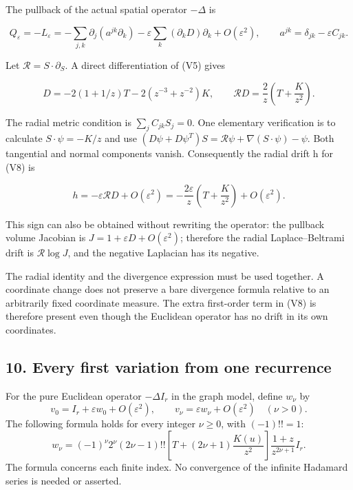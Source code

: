 \documentclass[
  11pt,
]{article}
\begin{document}
The pullback of the actual spatial operator \(-\Delta\) is

\[
 Q_\varepsilon=-L_\varepsilon
 =-\sum_{j,k}\partial_j(a^{jk}\partial_k)
       -\varepsilon\sum_k(\partial_kD)\partial_k
       +O(\varepsilon^2),\qquad
 a^{jk}=\delta_{jk}-\varepsilon C_{jk}.
 \tag{V8}
\]

Let \(\mathcal R=S\cdot\partial_S\). A direct differentiation of (V5)
gives

\[
 D=-2(1+1/z)T-2(z^{-3}+z^{-2})K,
 \qquad
 \mathcal R D=\frac2z\left(T+\frac K{z^2}\right).
 \tag{V9}
\]

The radial metric condition is \(\sum_j C_{jk}S_j=0\). One elementary
verification is to calculate \(S\cdot\psi=-K/z\) and use
\((D\psi+D\psi^T)S=\mathcal R\psi+\nabla(S\cdot\psi)-\psi\). Both
tangential and normal components vanish. Consequently the radial drift h
for (V8) is

\[
 h=-\varepsilon\mathcal R D+O(\varepsilon^2)
   =-\frac{2\varepsilon}{z}\left(T+\frac K{z^2}\right)
     +O(\varepsilon^2).
 \tag{V10}
\]

This sign can also be obtained without rewriting the operator: the
pullback volume Jacobian is \(J=1+\varepsilon D+O(\varepsilon^2)\);
therefore the radial Laplace--Beltrami drift is \(\mathcal R\log J\),
and the negative Laplacian has its negative.

The radial identity and the divergence expression must be used together.
A coordinate change does not preserve a bare divergence formula relative
to an arbitrarily fixed coordinate measure. The extra first-order term
in (V8) is therefore present even though the Euclidean operator has no
drift in its own coordinates.

\subsection{10. Every first variation from one
recurrence}\label{every-first-variation-from-one-recurrence}

For the pure Euclidean operator \(-\Delta I_r\) in the graph model,
define \(w_\nu\) by \[
 v_0=I_r+\varepsilon w_0+O(\varepsilon^2),\qquad
 v_\nu=\varepsilon w_\nu+O(\varepsilon^2)\quad(\nu>0).
 \tag{R33}
\] The following formula holds for every integer \(\nu\geq0\), with
\((-1)!!=1\): \[
 w_\nu=(-1)^\nu 2^\nu(2\nu-1)!!
   \left[T+(2\nu+1)\frac{K(u)}{z^2}\right]
                 \frac{1+z}{z^{2\nu+1}}I_r.                 \tag{V1}
\] The formula concerns each finite index. No convergence of the
infinite Hadamard series is needed or asserted.
\end{document}
